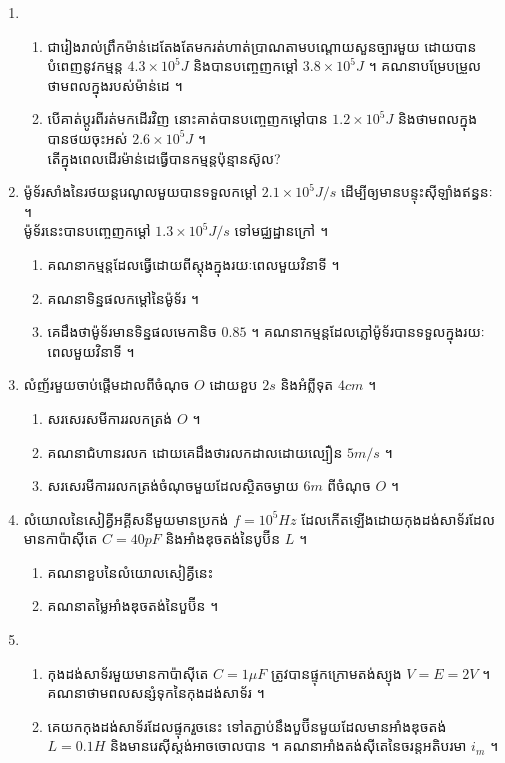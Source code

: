 \documentclass{officialexam}
\begin{document}
\begin{enumerate}[I]
	\item \begin{enumerate}[k]
		\item ជារៀងរាល់ព្រឹកម៉ាន់ដេតែងតែមករត់ហាត់ប្រាណតាមបណ្តោយសួនច្បារមួយ ដោយបានបំពេញនូវកម្មន្ត $4.3\times10^5 J$ និងបានបញ្ចេញកម្តៅ $3.8\times10^5 J$ ។ គណនាបម្រែបម្រួលថាមពលក្នុងរបស់ម៉ាន់ដេ ។
		\item បើគាត់ប្តូរពីរត់មកដើរវិញ នោះគាត់បានបញ្ចេញកម្តៅបាន $1.2\times10^5 J$ និងថាមពលក្នុងបានថយចុះអស់ $2.6\times10^5 J$ ។ \\តើក្នុងពេលដើរម៉ាន់ដេធ្វើបានកម្មន្តប៉ុន្មានស៊ូល?
	\end{enumerate}
	\item ម៉ូទ័រសាំងនៃរថយន្តរេណូលមួយបានទទួលកម្តៅ $2.1\times10^5J/s$ ដើម្បីឲ្យមានបន្ទុះស៊ីឡាំងឥន្ធនៈ ។\\ម៉ូទ័រនេះបានបញ្ចេញកម្តៅ $1.3\times10^5J/s$ ទៅមជ្ឈដ្ឋានក្រៅ ។
	\begin{enumerate}[k]
		\item គណនាកម្មន្តដែលធ្វើដោយពីស្តុងក្នុងរយៈពេលមួយវិនាទី ។
		\item គណនាទិន្នផលកម្តៅនៃម៉ូទ័រ ។
		\item គេដឹងថាម៉ូទ័រមានទិន្នផលមេកានិច $0.85$ ។ គណនាកម្មន្តដែលភ្លៅម៉ូទ័របានទទួលក្នុងរយៈពេលមួយវិនាទី ។
	\end{enumerate}
	\item លំញ័រមួយចាប់ផ្តើមដាលពីចំណុច $O$ ដោយខួប $2s$ និងអំព្លីទុត $4cm$ ។
	\begin{enumerate}[k]
		\item សរសេរសមីការរលកត្រង់ $O$ ។
		\item គណនាជំហានរលក ដោយគេដឹងថារលកដាលដោយល្បឿន $5m/s$ ។
		\item សរសេរមីការរលកត្រង់ចំណុចមួយដែលស្ថិតចម្ងាយ $6m$ ពីចំណុច $O$ ។
	\end{enumerate}
	\item លំយោលនៃសៀគ្វីអគ្គីសនីមួយមានប្រកង់ $f=10^5 Hz$ ដែលកើតឡើងដោយកុងដង់សាទ័រដែលមានកាប៉ាស៊ីតេ $C=40pF$ និងអាំងឌុចតង់នៃបូប៊ីន $L$ ។
	\begin{enumerate}[k]
		\item គណនាខួបនៃលំយោលសៀគ្វីនេះ​
		\item គណនាតម្លៃអាំងឌុចតង់នៃបួប៊ីន ។
	\end{enumerate}
	\item \begin{enumerate}[k]
		\item កុងដង់សាទ័រមួយមានកាប៉ាស៊ីតេ $C=1\mu F$ ត្រូវបានផ្ទុកក្រោមតង់ស្យុង $V=E=2V$ ។\\ គណនាថាមពលសន្សំទុកនៃកុងដង់សាទ័រ ។
		\item គេយកកុងដង់សាទ័រដែលផ្ទុករួចនេះ ទៅតភ្ជាប់នឹងបួប៊ីនមួយដែលមានអាំងឌុចតង់ $L=0.1H$ និងមានរេស៊ីស្តង់អាចចោលបាន ។ គណនាអាំងតង់ស៊ីតេនៃចរន្តអតិបរមា $i_m$ ។ 

\end{enumerate}
\end{enumerate}
\end{document}
